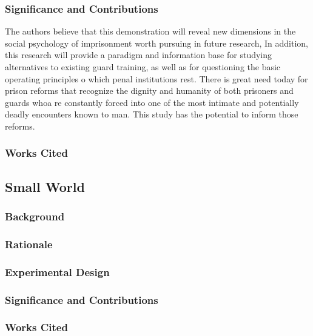 \begin{refsection}
\subsubsection{Significance and Contributions}
\label{significanceandcontributions}

The authors believe that this demonstration will reveal new dimensions in the social psychology of imprisonment worth pursuing in future research, In addition, this research will provide a paradigm and information base for studying alternatives to existing guard training, as well as for questioning the basic operating principles o which penal institutions rest. There is great need today for prison reforms that recognize the dignity and humanity of both prisoners and guards whoa re constantly forced into one of the most intimate and potentially deadly encounters known to man. This study has the potential to inform those reforms.

\subsubsection{Works Cited}
\label{workscited}

\newpage

\subsection{Small World}
\label{smallworld}

\subsubsection{Background}
\label{background}

\subsubsection{Rationale}
\label{rationale}

\subsubsection{Experimental Design}
\label{experimentaldesign}

\subsubsection{Significance and Contributions}
\label{significanceandcontributions}

\subsubsection{Works Cited}
\label{workscited}


\end{refsection}
